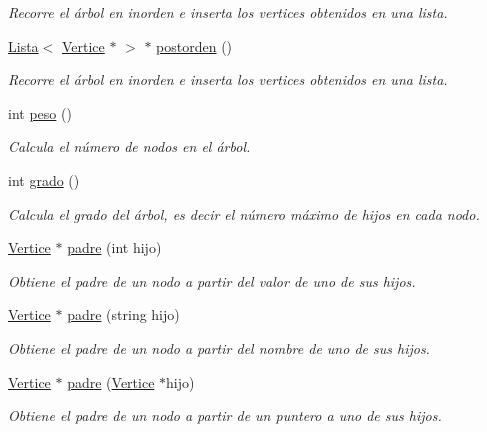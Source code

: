 \begin{DoxyCompactItemize}
\begin{DoxyCompactList}\small\item\em Recorre el árbol en inorden e inserta los vertices obtenidos en una lista. \end{DoxyCompactList}\item 
\hyperlink{classLista}{Lista}$<$ \hyperlink{classVertice}{Vertice} $\ast$ $>$ $\ast$ \hyperlink{classArbol_a126e7d801dbe214ac39f183c26e9135d}{postorden} ()
\begin{DoxyCompactList}\small\item\em Recorre el árbol en inorden e inserta los vertices obtenidos en una lista. \end{DoxyCompactList}\item 
int \hyperlink{classArbol_a9051a6b4120b42ff8d046f41ab73dbaa}{peso} ()
\begin{DoxyCompactList}\small\item\em Calcula el número de nodos en el árbol. \end{DoxyCompactList}\item 
int \hyperlink{classArbol_a99e608849650b891c34852a81f93d4ab}{grado} ()
\begin{DoxyCompactList}\small\item\em Calcula el grado del árbol, es decir el número máximo de hijos en cada nodo. \end{DoxyCompactList}\item 
\hyperlink{classVertice}{Vertice} $\ast$ \hyperlink{classArbol_abcb8c26e9021a1418de71ad6014351cf}{padre} (int hijo)
\begin{DoxyCompactList}\small\item\em Obtiene el padre de un nodo a partir del valor de uno de sus hijos. \end{DoxyCompactList}\item 
\hyperlink{classVertice}{Vertice} $\ast$ \hyperlink{classArbol_a53527e7a8999ceda0b8a0fa25a3f357c}{padre} (string hijo)
\begin{DoxyCompactList}\small\item\em Obtiene el padre de un nodo a partir del nombre de uno de sus hijos. \end{DoxyCompactList}\item 
\hyperlink{classVertice}{Vertice} $\ast$ \hyperlink{classArbol_a3395234bc7b7a91d2880e10367039284}{padre} (\hyperlink{classVertice}{Vertice} $\ast$hijo)
\begin{DoxyCompactList}\small\item\em Obtiene el padre de un nodo a partir de un puntero a uno de sus hijos. \end{DoxyCompactList}\item 

\end{DoxyCompactItemize}

